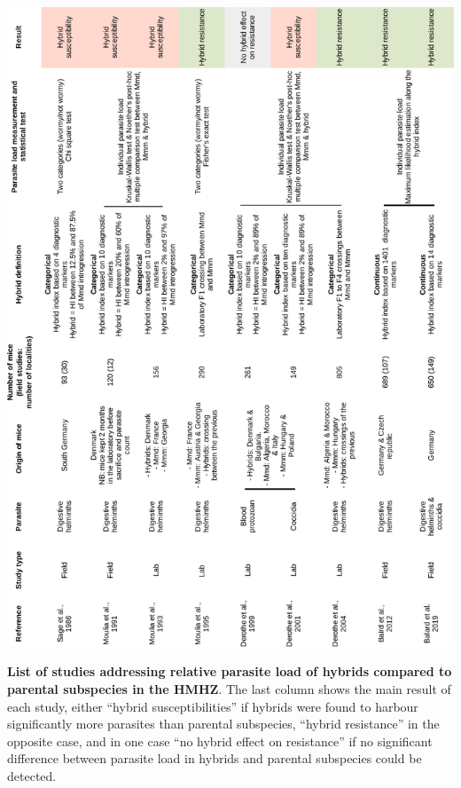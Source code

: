 \begin{table}[H]
	\centering
	\includegraphics[width=\linewidth,height=\textheight,keepaspectratio]{images/4discussion/Table1.pdf}
	\caption{\textbf{List of studies addressing relative parasite load of hybrids compared to parental subspecies in the HMHZ}. The last column shows the main result of each study, either “hybrid susceptibilities” if hybrids were found to harbour significantly more parasites than parental subspecies, “hybrid resistance” in the opposite case, and in one case “no hybrid effect on resistance” if no significant difference between parasite load in hybrids and parental subspecies could be detected.}
\end{table}

